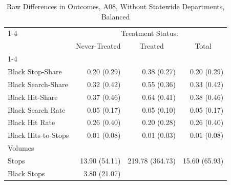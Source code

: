 \begin{table}[!h]
\caption{Raw Differences in Outcomes, A08, Without Statewide Departments, Balanced}
\centering
\begin{tabular}{llll}
\cline{1-4}
\multicolumn{1}{r}{} &
  \multicolumn{3}{c}{Treatment Status:} \\
\multicolumn{1}{r}{} &
  \multicolumn{1}{c}{Never-Treated} &
  \multicolumn{1}{c}{Treated} &
  \multicolumn{1}{c}{Total} \\
\cline{1-4}
\multicolumn{1}{l}{Rates} &
  \multicolumn{1}{r}{} &
  \multicolumn{1}{r}{} &
  \multicolumn{1}{r}{} \\
\multicolumn{1}{l}{\hspace{1em}Black Stop-Share} &
  \multicolumn{1}{r}{0.20 (0.29)} &
  \multicolumn{1}{r}{0.38 (0.27)} &
  \multicolumn{1}{r}{0.20 (0.29)} \\
\multicolumn{1}{l}{\hspace{1em}Black Search-Share} &
  \multicolumn{1}{r}{0.32 (0.42)} &
  \multicolumn{1}{r}{0.55 (0.36)} &
  \multicolumn{1}{r}{0.33 (0.42)} \\
\multicolumn{1}{l}{\hspace{1em}Black Hit-Share} &
  \multicolumn{1}{r}{0.37 (0.46)} &
  \multicolumn{1}{r}{0.64 (0.41)} &
  \multicolumn{1}{r}{0.38 (0.46)} \\
\multicolumn{1}{l}{\hspace{1em}Black Search Rate} &
  \multicolumn{1}{r}{0.05 (0.17)} &
  \multicolumn{1}{r}{0.05 (0.10)} &
  \multicolumn{1}{r}{0.05 (0.17)} \\
\multicolumn{1}{l}{\hspace{1em}Black Hit Rate} &
  \multicolumn{1}{r}{0.26 (0.40)} &
  \multicolumn{1}{r}{0.20 (0.28)} &
  \multicolumn{1}{r}{0.26 (0.40)} \\
\multicolumn{1}{l}{\hspace{1em}Black Hits-to-Stops} &
  \multicolumn{1}{r}{0.01 (0.08)} &
  \multicolumn{1}{r}{0.01 (0.03)} &
  \multicolumn{1}{r}{0.01 (0.08)} \\
\multicolumn{1}{l}{Volumes} &
  \multicolumn{1}{r}{} &
  \multicolumn{1}{r}{} &
  \multicolumn{1}{r}{} \\
\multicolumn{1}{l}{\hspace{1em}Stops} &
  \multicolumn{1}{r}{13.90 (54.11)} &
  \multicolumn{1}{r}{219.78 (364.73)} &
  \multicolumn{1}{r}{15.60 (65.93)} \\
\multicolumn{1}{l}{\hspace{1em}Black Stops} &
  \multicolumn{1}{r}{3.80 (21.07)} &

\end{tabular}
\end{table}
